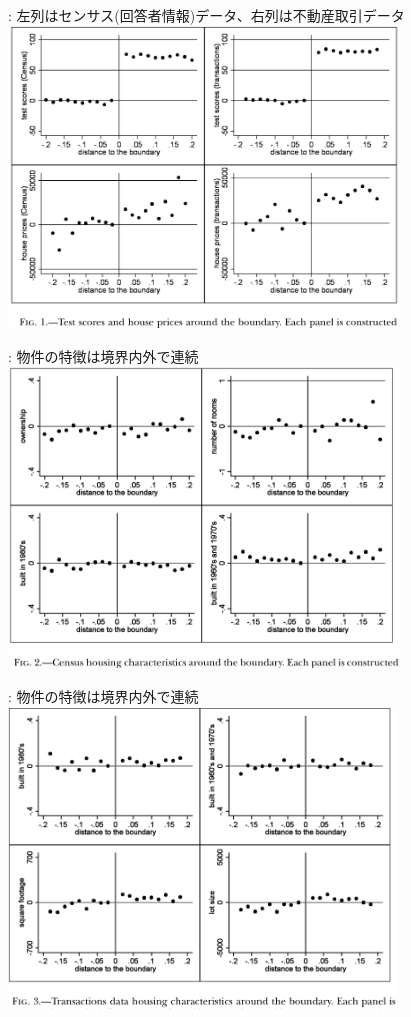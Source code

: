 \begin{frame}{}
\citet{BayerFerreiraMcMillan2007}: 左列はセンサス(回答者情報)データ、右列は不動産取引データ\\
\hfil\includegraphics[height = 8cm]{ImpactEvaluation/figure/Bayer_Fig1.jpg}\\
\end{frame}
\begin{frame}{}
\citet{BayerFerreiraMcMillan2007}: 物件の特徴は境界内外で連続\\
\hfil\includegraphics[height = 8cm]{ImpactEvaluation/figure/Bayer_Fig2.jpg}\\
\end{frame}
\begin{frame}{}
\citet{BayerFerreiraMcMillan2007}: 物件の特徴は境界内外で連続\\
\hfil\includegraphics[height = 8cm]{ImpactEvaluation/figure/Bayer_Fig3.jpg}\\
\end{frame}
